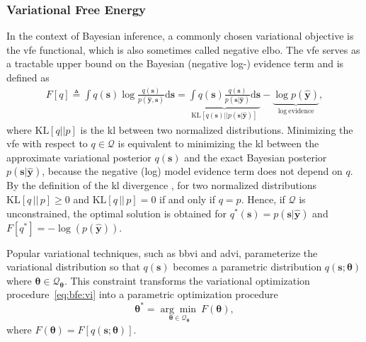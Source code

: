 \subsubsection{Variational Free Energy}

In the context of Bayesian inference, a commonly chosen variational objective is the \acf{vfe} functional, which is also sometimes called negative \ac{elbo}. The \ac{vfe} serves as a tractable upper bound on the Bayesian (negative log-) evidence term \citep{bishop_pattern_2006} and is defined as
\begin{equation}
    \label{eq:bfe:vfe} 
    \begin{aligned}
    F[q] \triangleq 
    \int q(\bm{s}) \log \frac{q(\bm{s})}{p(\hat{\bm{y}}, \bm{s})} \mathrm{d}\bm{s}
    = \underbrace{\int q(\bm{s})\frac{q(\bm{s})}{p(\bm{s}\vert\hat{\bm{y}})}\mathrm{d}\bm{s}}_{\mathrm{KL}\left[q(\bm{s})\vert\vert p(\bm{s}\vert\hat{\bm{y}})\right]} - \underbrace{\log p(\hat{\bm{y}})}_{\mathrm{log~evidence}},
    \end{aligned}
  \end{equation} 
where $\mathrm{KL}\left[q \vert\vert p\right]$ is the \ac{kl} between two normalized distributions.
Minimizing the \ac{vfe} with respect to $q \in \mathcal{Q}$ is equivalent to minimizing the \ac{kl} between the approximate variational posterior $q(\bm{s})$ and the exact Bayesian posterior $p(\bm{s}\vert\hat{\bm{y}})$, because the negative (log) model evidence term does not depend on $q$. 
By the definition of the \ac{kl} divergence \citep{kullback_information_1951}, for two normalized distributions $\mathrm{KL}\left[q\,\vert\vert\, p\right] \geq 0$ and
$\mathrm{KL}\left[q\,\vert\vert\,p\right] = 0$ if and only if $q = p$. 
Hence, if $\mathcal{Q}$ is unconstrained, the optimal solution is obtained for $q^*(\bm{s}) = p(\bm{s}\vert\hat{\bm{y}})$ and $F[q^*] = -\log(p(\hat{\bm{y}}))$.

Popular variational techniques, such as \ac{bbvi} and \ac{advi}, parameterize the variational distribution so that $q(\bm{s})$ becomes a parametric distribution $q(\bm{s}; \bm{\theta})$ where $\bm{\theta} \in \mathcal{Q}_{\bm{\theta}}$.
This constraint transforms the variational optimization procedure~\eqref{eq:bfe:vi} into a
parametric optimization procedure 
\begin{equation}
    \label{eq:bfe:vi_parametrized} \bm{\theta}^* = \underset{\bm{\theta} \in
    \mathcal{Q}_{\bm{\theta}}}{\arg\min~} F(\bm{\theta}),
\end{equation} where $F(\bm{\theta}) = F[q(\bm{s};\bm{\theta})]$. 

